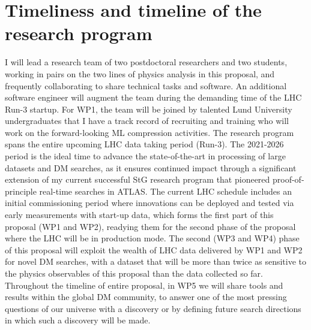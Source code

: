\documentclass[11pt,a4paper]{article}
\begin{document}
\section{Timeliness and timeline of the research program} 
\smallskip

I will lead a research team of two postdoctoral researchers and two students, working in pairs on the two lines of physics analysis in this proposal, and frequently collaborating to share technical tasks and software. An additional software engineer will augment the team during the demanding time of the LHC Run-3 startup. 
For WP1, the team will be joined by talented Lund University undergraduates that I have a track record of recruiting and training who will work on the forward-looking ML compression activities.
The research program spans the entire upcoming LHC data taking period (Run-3).
The 2021-2026 period is the ideal time to advance the state-of-the-art in processing of large datasets and DM searches, as it ensures continued impact through a significant extension of my current successful StG research program that pioneered proof-of-principle real-time searches in ATLAS. 
The current LHC schedule includes an initial commissioning period where innovations can be deployed and tested via early measurements with start-up data, which forms the first part of this proposal (WP1 and WP2), readying them for the second phase of the proposal where the LHC will be in production mode.   
The second (WP3 and WP4) phase of this proposal will exploit the wealth of LHC data delivered by WP1 and WP2 for novel DM searches, with a dataset that will be more than \color{red}twice \color{black} as sensitive to the physics observables of this proposal than the data collected so far. 
Throughout the timeline of entire proposal, in WP5 we will share tools and results within the global DM community, to answer one of the most pressing questions of our universe with a discovery or by defining future search directions in which such a discovery will be made. 

\end{document}
